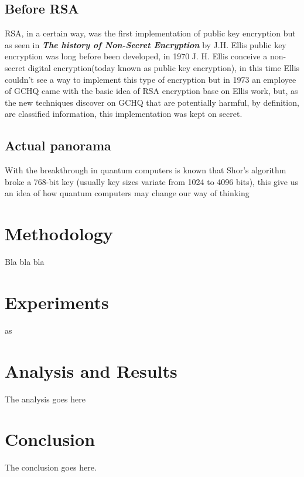 \documentclass[conference,compsoc, 10pt]{IEEEtran}
\begin{document}
\subsection{Before RSA}
RSA, in a certain way, was the first implementation of public key encryption but as seen in \textbf{\textit{The history of Non-Secret Encryption}} by J.H. Ellis public key encryption was long before been developed, in 1970 J. H. Ellis conceive a non-secret digital encryption(today known as public key encryption), in this time Ellis couldn't see a way to implement this type of encryption but in 1973 an employee of GCHQ came with the basic idea of RSA encryption base on Ellis work, but, as the new techniques discover on GCHQ that are potentially harmful, by definition, are classified information, this implementation was kept on secret.

\subsection{Actual panorama}
With the breakthrough in quantum computers is known that Shor's algorithm broke a 768-bit key (usually key sizes variate from 1024 to 4096 bits), this give us an idea of how quantum computers may change our way of thinking

\section{Methodology}
Bla bla bla

\section{Experiments}
as

\section{Analysis and Results}
The analysis goes here

\section{Conclusion}
The conclusion goes here.
\end{document}
